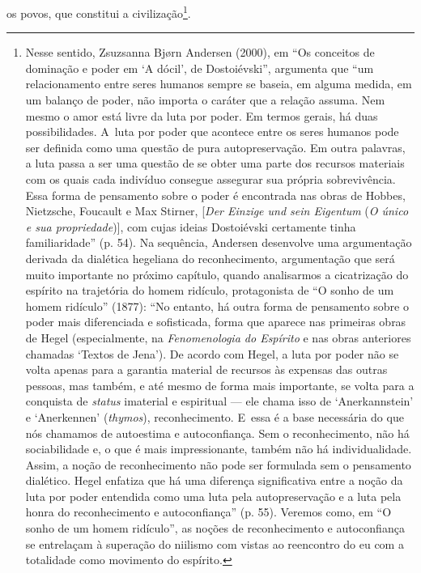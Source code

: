 os povos, que constitui a civilização\footnote{Nesse sentido, Zsuzsanna
  Bjørn Andersen (2000), em ``Os conceitos de dominação e poder em `A
  dócil', de Dostoiévski'', argumenta que ``um relacionamento entre
  seres humanos sempre se baseia, em alguma medida, em um balanço de
  poder, não importa o caráter que a relação assuma. Nem mesmo o amor
  está livre da luta por poder. Em termos gerais, há duas
  possibilidades. A~luta por poder que acontece entre os seres humanos
  pode ser definida como uma questão de pura autopreservação. Em outra
  palavras, a luta passa a ser uma questão de se obter uma parte dos
  recursos materiais com os quais cada indivíduo consegue assegurar sua
  própria sobrevivência. Essa forma de pensamento sobre o poder é
  encontrada nas obras de Hobbes, Nietzsche, Foucault e Max Stirner,
  {[}\emph{Der Einzige und sein Eigentum} (\emph{O único e sua
  propriedade}){]}, com cujas ideias Dostoiévski certamente tinha
  familiaridade'' (p. 54). Na sequência, Andersen desenvolve uma
  argumentação derivada da dialética hegeliana do reconhecimento,
  argumentação que será muito importante no próximo capítulo, quando
  analisarmos a cicatrização do espírito na trajetória do homem
  ridículo, protagonista de ``O sonho de um homem ridículo'' (1877):
  ``No entanto, há outra forma de pensamento sobre o poder mais
  diferenciada e sofisticada, forma que aparece nas primeiras obras de
  Hegel (especialmente, na \emph{Fenomenologia do Espírito} e nas obras
  anteriores chamadas `Textos de Jena'). De acordo com Hegel, a luta por
  poder não se volta apenas para a garantia material de recursos às
  expensas das outras pessoas, mas também, e até mesmo de forma mais
  importante, se volta para a conquista de \emph{status} imaterial e
  espiritual --- ele chama isso de `Anerkannstein' e `Anerkennen'
  (\emph{thymos}), reconhecimento. E~essa é a base necessária do que nós
  chamamos de autoestima e autoconfiança. Sem o reconhecimento, não há
  sociabilidade e, o que é mais impressionante, também não há
  individualidade. Assim, a noção de reconhecimento não pode ser
  formulada sem o pensamento dialético. Hegel enfatiza que há uma
  diferença significativa entre a noção da luta por poder entendida como
  uma luta pela autopreservação e a luta pela honra do reconhecimento e
  autoconfiança'' (p. 55). Veremos como, em ``O sonho de um homem
  ridículo'', as noções de reconhecimento e autoconfiança se entrelaçam
  à superação do niilismo com vistas ao reencontro do eu com a
  totalidade como movimento do espírito.}.


